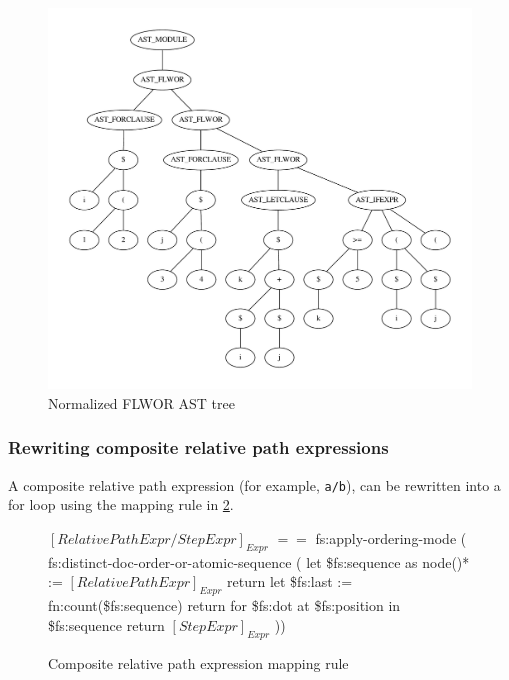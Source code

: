 \begin{figure}[h!]
\centering
 \includegraphics[scale=0.50]{img/graphs/flwor_rewrite2}
\caption{Normalized FLWOR AST tree}
\label{tree:ast:flwor_rewrite2}
\end{figure}

\subsubsection{Rewriting composite relative path expressions}
A composite relative path expression (for example, \verb!a/b!), can be
rewritten into a for loop using the mapping rule in
\ref{figure:xquery:relpath_mapping_rule}.

\begin{figure}[!h]
\centering
$[RelativePathExpr / StepExpr]_{Expr}$ \newline
$==$ \newline
fs:apply-ordering-mode ( \newline
fs:distinct-doc-order-or-atomic-sequence ( \newline
    let \$fs:sequence as node()* := $[RelativePathExpr]_{Expr}$ return \newline
    let \$fs:last := fn:count(\$fs:sequence) return \newline
    for \$fs:dot at \$fs:position in \$fs:sequence return \newline
       $[StepExpr]_{Expr}$
))
  \caption{Composite relative path expression mapping rule}
  \label{figure:xquery:relpath_mapping_rule}
\end{figure}

